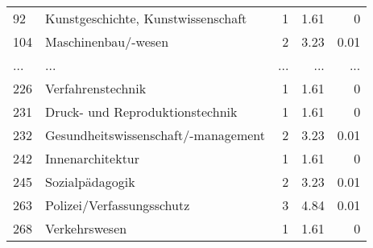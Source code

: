 \begin{longtable}{lXrrr}
        92 & \multicolumn{1}{X}{Kunstgeschichte, Kunstwissenschaft} & %
          \num{1} &
          \num[round-mode=places,round-precision=2]{1,61} &
          \num[round-mode=places,round-precision=2]{0} \\
        104 & \multicolumn{1}{X}{Maschinenbau/-wesen} & %
          \num{2} &
          \num[round-mode=places,round-precision=2]{3,23} &
          \num[round-mode=places,round-precision=2]{0,01} \\
       ... & ... & ... & ... & ... \\
        226 & \multicolumn{1}{X}{Verfahrenstechnik} & %
          \num{1} &
          \num[round-mode=places,round-precision=2]{1,61} &
          \num[round-mode=places,round-precision=2]{0} \\

        231 & \multicolumn{1}{X}{Druck- und Reproduktionstechnik} & %
          \num{1} &
          \num[round-mode=places,round-precision=2]{1,61} &
          \num[round-mode=places,round-precision=2]{0} \\

        232 & \multicolumn{1}{X}{Gesundheitswissenschaft/-management} & %
          \num{2} &
          \num[round-mode=places,round-precision=2]{3,23} &
          \num[round-mode=places,round-precision=2]{0,01} \\

        242 & \multicolumn{1}{X}{Innenarchitektur} & %
          \num{1} &
          \num[round-mode=places,round-precision=2]{1,61} &
          \num[round-mode=places,round-precision=2]{0} \\

        245 & \multicolumn{1}{X}{Sozialpädagogik} & %
          \num{2} &
          \num[round-mode=places,round-precision=2]{3,23} &
          \num[round-mode=places,round-precision=2]{0,01} \\

        263 & \multicolumn{1}{X}{Polizei/Verfassungsschutz} & %
          \num{3} &
          \num[round-mode=places,round-precision=2]{4,84} &
          \num[round-mode=places,round-precision=2]{0,01} \\

        268 & \multicolumn{1}{X}{Verkehrswesen} & %
          \num{1} &
          \num[round-mode=places,round-precision=2]{1,61} &
          \num[round-mode=places,round-precision=2]{0} \\


\end{longtable}
